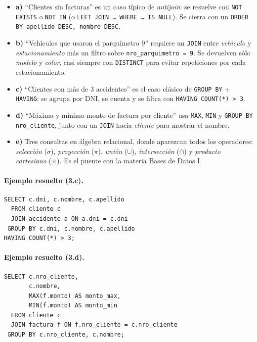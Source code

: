 \documentclass[11pt,a4paper]{article}
\begin{document}
\begin{itemize}
    \item \textbf{a)} ``Clientes sin facturas'' es un caso típico de
    \emph{antijoin}: se resuelve con \texttt{NOT EXISTS} o \texttt{NOT IN}
    (o \texttt{LEFT JOIN \dots\ WHERE \dots\ IS NULL}). Se cierra con un
    \texttt{ORDER BY apellido DESC, nombre DESC}.
    \item \textbf{b)} ``Vehículos que usaron el parquímetro 9'' requiere un
    \texttt{JOIN} entre \emph{vehiculo} y \emph{estacionamiento} más un
    filtro sobre \texttt{nro\_parquimetro = 9}. Se devuelven sólo
    \emph{modelo} y \emph{color}, casi siempre con \texttt{DISTINCT}
    para evitar repeticiones por cada estacionamiento.
    \item \textbf{c)} ``Clientes con más de 3 accidentes'' es el caso clásico
    de \texttt{GROUP BY} + \texttt{HAVING}: se agrupa por DNI, se cuenta y
    se filtra con \texttt{HAVING COUNT(*) > 3}.
    \item \textbf{d)} ``Máximo y mínimo monto de factura por cliente'' usa
    \texttt{MAX}, \texttt{MIN} y \texttt{GROUP BY nro\_cliente}, junto con un
    \texttt{JOIN} hacia \emph{cliente} para mostrar el nombre.
    \item \textbf{e)} Tres consultas en álgebra relacional, donde aparezcan
    todos los operadores: \emph{selección} ($\sigma$), \emph{proyección}
    ($\pi$), \emph{unión} ($\cup$), \emph{intersección} ($\cap$) y
    \emph{producto cartesiano} ($\times$). Es el puente con la materia
    Bases de Datos I.
\end{itemize}

\paragraph{Ejemplo resuelto (3.c).}

\begin{lstlisting}
SELECT c.dni, c.nombre, c.apellido
  FROM cliente c
  JOIN accidente a ON a.dni = c.dni
 GROUP BY c.dni, c.nombre, c.apellido
HAVING COUNT(*) > 3;
\end{lstlisting}

\paragraph{Ejemplo resuelto (3.d).}

\begin{lstlisting}
SELECT c.nro_cliente,
       c.nombre,
       MAX(f.monto) AS monto_max,
       MIN(f.monto) AS monto_min
  FROM cliente c
  JOIN factura f ON f.nro_cliente = c.nro_cliente
 GROUP BY c.nro_cliente, c.nombre;
\end{lstlisting}
\end{document}
